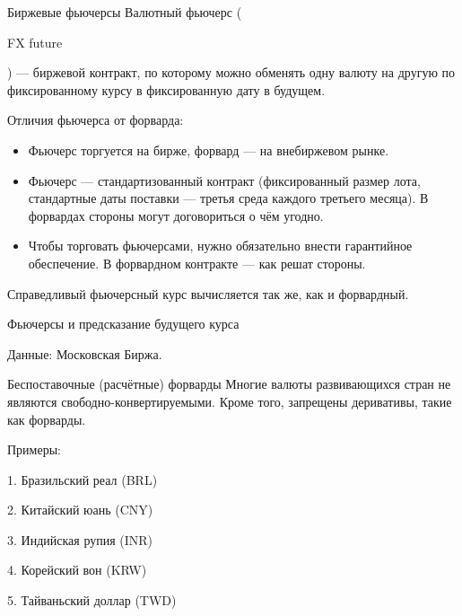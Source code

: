 \documentclass{beamer}
\newcommand{\en}[1]{\begin{otherlanguage}{english}#1\end{otherlanguage}}
\begin{document}
\begin{frame}{Биржевые фьючерсы}
\justify
\alert{Валютный фьючерс} (\en{FX future}) --- биржевой контракт, по которому можно обменять одну валюту на другую по фиксированному курсу в фиксированную дату в будущем.

\justify
Отличия фьючерса от форварда:
\begin{itemize}
\justifying
\item Фьючерс торгуется на бирже, форвард --- на внебиржевом рынке.
\item Фьючерс --- стандартизованный контракт (фиксированный размер лота, стандартные даты поставки --- третья среда каждого третьего месяца). В форвардах стороны могут договориться о чём угодно.
\item Чтобы торговать фьючерсами, нужно обязательно внести гарантийное обеспечение. В форвардном контракте --- как решат стороны.
\end{itemize}

\justify
Справедливый фьючерсный курс вычисляется так же, как и форвардный.
\end{frame}



\begin{frame}{Фьючерсы и предсказание будущего курса}
\center
{}

\scriptsize Данные: Московская Биржа.
\end{frame}



\begin{frame}{Беспоставочные (расчётные) форварды}
\justify
Многие валюты развивающихся стран не являются свободно-конвертируемыми. Кроме того, запрещены деривативы, такие как форварды.

\justify
Примеры:

1. Бразильский реал (BRL)

2. Китайский юань (CNY)

3. Индийская рупия (INR)

4. Корейский вон (KRW)

5. Тайваньский доллар (TWD)
\end{frame}
\end{document}
